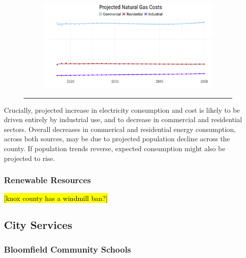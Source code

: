 \begin{figure}[H]
\begin{framed}
\begin{subfigure}{0.49\textwidth}
     \end{subfigure}
     \begin{subfigure}{0.49\textwidth}
        \centering
        \includegraphics[width=\linewidth]{figures/energy_cost_ng.png}
     \end{subfigure}
    \rule[-5pt]{\linewidth}{0.4pt}
\end{framed}
\end{figure}

\noindent Crucially, projected increase in electricity consumption and cost is likely to be driven entirely by industrial use, and to decrease in commercial and residential sectors. Overall decreases in commerical and residential energy consumption, across both sources, may be due to projected population decline across the county. If population trends reverse, expected consumption might also be projected to rise.

\subsubsection*{Renewable Resources}
\noindent \hl{[knox county has a windmill ban?]}

\pagebreak
\subsection{City Services}

\subsubsection*{Bloomfield Community Schools}

